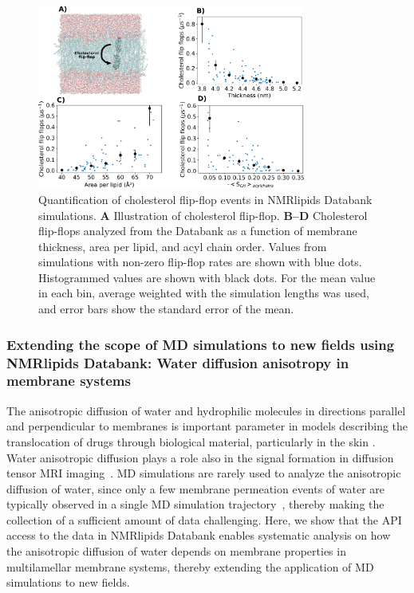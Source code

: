\documentclass[fleqn,10pt]{wlscirep}
\begin{document}
\begin{figure}[htb]
    \centering
    \includegraphics[width=88mm]{Figures/CholFlipFlops.pdf}
    \caption{Quantification of cholesterol flip-flop events in NMRlipids Databank simulations. 
    \textbf{A} Illustration of cholesterol flip-flop.  
      \textbf{B--D} Cholesterol flip-flops analyzed from the Databank as a function of membrane thickness, area per lipid, and acyl chain order. Values from simulations with non-zero flip-flop rates are shown with blue dots. Histogrammed values are shown with black dots. For the mean value in each bin, average weighted with the simulation lengths was used, and error bars show the standard error of the mean.
    }
    \label{fig:flip-flops}
\end{figure}



\subsubsection{Extending the scope of MD simulations to new fields using NMRlipids Databank: Water diffusion anisotropy in membrane systems}
The anisotropic diffusion of water and hydrophilic molecules in directions parallel and perpendicular to membranes is important parameter in models describing the translocation of drugs through biological material, particularly in the skin \cite{hansen13,wen18,nitsche19,roberts21}. Water anisotropic diffusion plays a role also in the signal formation in diffusion tensor MRI imaging~\cite{topgaard20}. MD simulations are rarely used to analyze the anisotropic diffusion of water, since only a few membrane permeation events of water are typically observed in a single MD simulation trajectory~\cite{venable19,camilo2022}, thereby making the collection of a sufficient amount of data challenging. Here, we show that the API access to the data in NMRlipids Databank enables systematic analysis on how the anisotropic diffusion of water depends on membrane properties in multilamellar membrane systems, thereby extending the application of MD simulations to new fields. 
\end{document}
